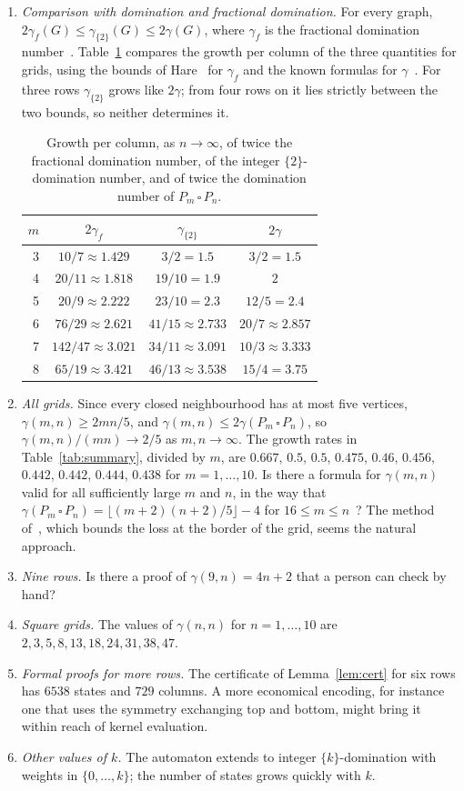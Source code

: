 \documentclass[12pt]{article}
\newcommand{\fl}[1]{\lfloor #1 \rfloor}
\newcommand{\g}{\gamma_{\{2\}}}
\newcommand{\G}[2]{P_{#1}\,\square\,P_{#2}}
\theoremstyle{plain}
\theoremstyle{remark}
\begin{document}
\begin{enumerate}
\item \emph{Comparison with domination and fractional domination.} For every graph,
$2\gamma_f(G)\le\g(G)\le2\gamma(G)$, where $\gamma_f$ is the fractional domination
number~\cite{dhlf,bhk}. Table~\ref{tab:compare} compares the growth per column of the three
quantities for grids, using the bounds of Hare~\cite{hare94} for $\gamma_f$ and the known
formulas for $\gamma$~\cite{aciop,gprt}. For three rows $\g$ grows like $2\gamma$; from four
rows on it lies strictly between the two bounds, so neither determines it.
\begin{table}[ht]
\centering
\begin{tabular}{rccc}
\toprule
$m$ & $2\gamma_f$ & $\g$ & $2\gamma$\\
\midrule
3 & $10/7\approx1.429$ & $3/2=1.5$ & $3/2=1.5$\\
4 & $20/11\approx1.818$ & $19/10=1.9$ & $2$\\
5 & $20/9\approx2.222$ & $23/10=2.3$ & $12/5=2.4$\\
6 & $76/29\approx2.621$ & $41/15\approx2.733$ & $20/7\approx2.857$\\
7 & $142/47\approx3.021$ & $34/11\approx3.091$ & $10/3\approx3.333$\\
8 & $65/19\approx3.421$ & $46/13\approx3.538$ & $15/4=3.75$\\
\bottomrule
\end{tabular}
\caption{Growth per column, as $n\to\infty$, of twice the fractional domination number, of the
integer $\{2\}$-domination number, and of twice the domination number of $\G mn$.}\label{tab:compare}
\end{table}
\item \emph{All grids.} Since every closed neighbourhood has at most five vertices,
$\gamma(m,n)\ge 2mn/5$, and $\gamma(m,n)\le2\gamma(\G mn)$, so $\gamma(m,n)/(mn)\to2/5$ as
$m,n\to\infty$. The growth rates in Table~\ref{tab:summary}, divided by $m$, are
$0.667$, $0.5$, $0.5$, $0.475$, $0.46$, $0.456$, $0.442$, $0.442$, $0.444$, $0.438$ for
$m=1,\dots,10$.
Is there a formula for $\gamma(m,n)$ valid for all sufficiently large $m$
and $n$, in the way that $\gamma(\G mn)=\fl{(m+2)(n+2)/5}-4$ for $16\le m\le n$~\cite{gprt}?
The method of~\cite{gprt,rt}, which bounds the loss at the border of the grid, seems the
natural approach.
\item \emph{Nine rows.} Is there a proof of $\gamma(9,n)=4n+2$ that a person can check by hand?
\item \emph{Square grids.} The values of $\gamma(n,n)$ for $n=1,\dots,10$ are
$2,3,5,8,13,18,24,31,38,47$.
\item \emph{Formal proofs for more rows.} The certificate of Lemma~\ref{lem:cert} for six rows
has $6538$ states and $729$ columns. A more economical encoding, for instance one that uses the
symmetry exchanging top and bottom, might bring it within reach of kernel evaluation.
\item \emph{Other values of $k$.} The automaton extends to integer $\{k\}$-domination with
weights in $\{0,\dots,k\}$; the number of states grows quickly with $k$.
\end{enumerate}
\end{document}
